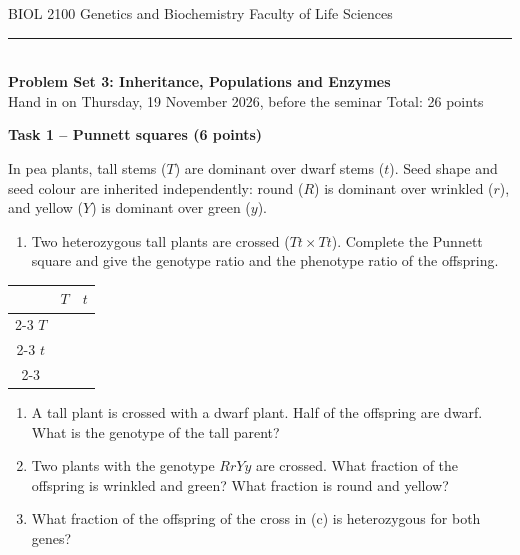 \documentclass[11pt,a4paper]{article}
\newcommand{\task}[3]{\bigskip\par\noindent\textbf{Task #1 -- #2 (#3 points)}\par\nopagebreak\smallskip}
\begin{document}
{\small BIOL 2100 \textperiodcentered{} Genetics and Biochemistry \hfill Faculty of Life Sciences}\\[-0.4em]
\rule{\linewidth}{0.6pt}\\[0.5em]
{\Large\bfseries Problem Set 3: Inheritance, Populations and Enzymes}\\[0.4em]
Hand in on Thursday, 19 November 2026, before the seminar \hfill Total: 26 points

\task{1}{Punnett squares}{6}
In pea plants, tall stems ($T$) are dominant over dwarf stems ($t$). Seed shape and seed colour are
inherited independently: round ($R$) is dominant over wrinkled ($r$), and yellow ($Y$) is dominant over
green ($y$).
\begin{enumerate}
  \item Two heterozygous tall plants are crossed ($Tt \times Tt$). Complete the Punnett square and give the
        genotype ratio and the phenotype ratio of the offspring.
\end{enumerate}
\begin{center}
\renewcommand{\arraystretch}{1.0}
\begin{tabular}{c|c|c|}
  \multicolumn{1}{c}{} & \multicolumn{1}{c}{$T$} & \multicolumn{1}{c}{$t$} \\ \cline{2-3}
  $T$ & \rule{0pt}{2.4em}\hspace{2.6em} & \hspace{2.6em} \\ \cline{2-3}
  $t$ & \rule{0pt}{2.4em} & \\ \cline{2-3}
\end{tabular}
\end{center}
\begin{enumerate}[resume]
  \item A tall plant is crossed with a dwarf plant. Half of the offspring are dwarf. What is the genotype of
        the tall parent?
  \item Two plants with the genotype $RrYy$ are crossed. What fraction of the offspring is wrinkled and green?
        What fraction is round and yellow?
  \item What fraction of the offspring of the cross in (c) is heterozygous for both genes?
\end{enumerate}
\end{document}
